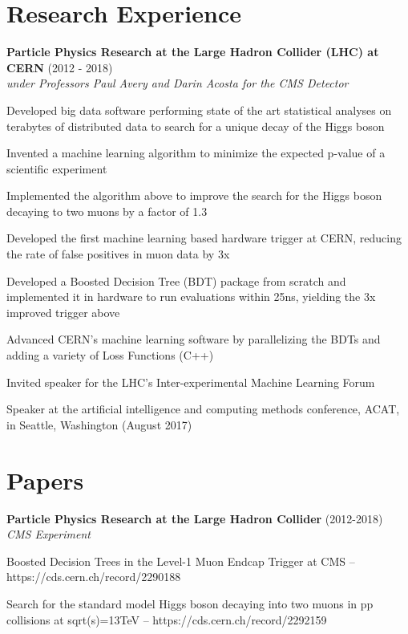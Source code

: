 \begin{resume}
    \section{\mysidestyle Research Experience}
    {\bf Particle Physics Research at the Large Hadron Collider (LHC) at CERN} (2012 - 2018)\\\vspace{2mm}%
    \textit{under Professors Paul Avery and Darin Acosta for the CMS Detector}
    \begin{stuff}
        \vspace*{1mm}
                \item Developed big data software performing state of the art statistical analyses on terabytes of distributed data to search for a unique decay of the Higgs boson
                \item Invented a machine learning algorithm to minimize the expected p-value of a scientific experiment
                \vspace*{12mm} 
                \item Implemented the algorithm above to improve the search for the Higgs boson decaying to two muons by a factor of 1.3 
                \item Developed the first machine learning based hardware trigger at CERN, reducing the rate of false positives in muon data by 3x
                \item Developed a Boosted Decision Tree (BDT) package from scratch and implemented it in hardware to run evaluations within 25ns, yielding the 3x improved trigger above
                \item Advanced CERN's machine learning software by parallelizing the BDTs and adding a variety of Loss Functions (C++)
                \item Invited speaker for the LHC's Inter-experimental Machine Learning Forum
                \item Speaker at the artificial intelligence and computing methods conference, ACAT, in Seattle, Washington (August 2017)
                                           
    \end{stuff}
    \section{\mysidestyle Papers}
    {\bf Particle Physics Research at the Large Hadron Collider} (2012-2018)\\\vspace{2mm}%
    \textit{CMS Experiment}
    \begin{stuff}
        \vspace*{1mm}
                \item Boosted Decision Trees in the Level-1 Muon Endcap Trigger at CMS -- \\\relax https://cds.cern.ch/record/2290188
                \item Search for the standard model Higgs boson decaying into two muons in pp collisions at sqrt(s)=13TeV -- https://cds.cern.ch/record/2292159
    \end{stuff}


\end{resume}
